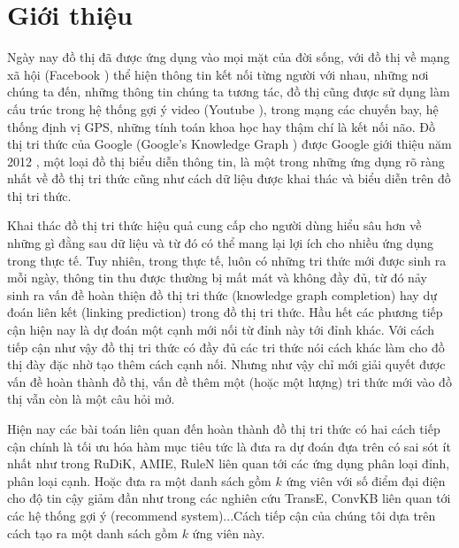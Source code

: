 \chapter{Giới thiệu}
\label{Chapter1}

Ngày nay đồ thị đã được ứng dụng vào mọi mặt của đời sống, với đồ thị về mạng xã hội (Facebook \cite{ugander2011anatomy}) thể hiện thông tin kết nối từng người với nhau, những nơi chúng ta đến, những thông tin chúng ta tương tác, đồ thị cũng được sử dụng làm cấu trúc trong hệ thống gợi ý video (Youtube \cite{baluja2008video}), trong mạng các chuyến bay, hệ thống định vị GPS, những tính toán khoa học hay thậm chí là kết nối não. Đồ thị tri thức của Google (Google's Knowledge Graph \cite{googlekg:2020}) được Google giới thiệu năm 2012 \cite{ji2020survey}, một loại đồ thị biểu diễn thông tin, là một trong những ứng dụng rõ ràng nhất về đồ thị tri thức cũng như cách dữ liệu được khai thác và biểu diễn trên đồ thị tri thức.

Khai thác đồ thị tri thức hiệu quả cung cấp cho người dùng hiểu sâu hơn về những gì đằng sau dữ liệu và từ đó có thể mang lại lợi ích cho nhiều ứng dụng trong thực tế. Tuy nhiên, trong thực tế, luôn có những tri thức mới được sinh ra mỗi ngày, thông tin thu được thường bị mất mát và không đầy đủ, từ đó nảy sinh ra vấn đề hoàn thiện đồ thị tri thức (knowledge graph completion) hay dự đoán liên kết (linking prediction) trong đồ thị tri thức.
Hầu hết các phương tiếp cận hiện nay là dự đoán một cạnh mới nối từ đỉnh này tới đỉnh khác. Với cách tiếp cận như vậy đồ thị tri thức có đầy đủ các tri thức nói cách khác làm cho đồ thị đày đặc nhờ tạo thêm cách cạnh nối. Nhưng như vậy chỉ mới giải quyết được vấn đề hoàn thành đồ thị, vấn đề thêm một (hoặc một lượng) tri thức mới vào đồ thị vẫn còn là một câu hỏi mở.

Hiện nay các bài toán liên quan đến hoàn thành đồ thị tri thức có hai cách tiếp cận chính là tối ưu hóa hàm mục tiêu tức là đưa ra dự đoán đựa trên có sai sót ít nhất như trong RuDiK\cite{ortona2018robust}, AMIE\cite{galarraga2015fast}, RuleN\cite{meilicke2018fine} liên quan tới các ứng dụng phân loại đỉnh, phân loại cạnh. Hoặc đưa ra một danh sách gồm \(k\) ứng viên với số điểm đại điện cho độ tin cậy giảm đần như trong các nghiên cứu TransE\cite{bordes2013translating}, ConvKB\cite{vu2019capsule} liên quan tới các hệ thống gợi ý (recommend system)...Cách tiếp cận của chúng tôi dựa trên cách tạo ra một danh sách gồm \(k\) ứng viên này.

